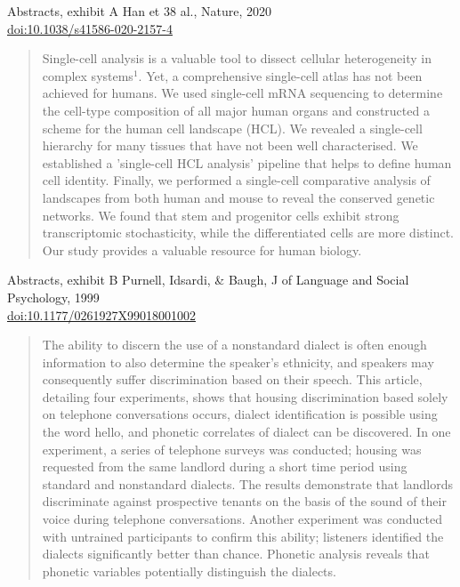 \documentclass[
	onepage, 
	12pt,
	hyperref={
		colorlinks = true,
		linkcolor = blue,
		urlcolor  = blue,
		citecolor = blue,
		anchorcolor = blue
	},
]{beamer}
\begin{document}
\begin{frame}[t]{Abstracts, exhibit A}{}
	\footnotesize
	Han et 38 al., Nature, 2020
	\\
	\href{https://doi.org/10.1038/s41586-020-2157-4}{doi:10.1038/s41586-020-2157-4}
	\begin{quote}
		Single-cell analysis is a valuable tool to dissect cellular heterogeneity in complex systems${}^{\text{1}}$. Yet, a comprehensive single-cell atlas has not been achieved for humans. We used single-cell mRNA sequencing to determine the cell-type composition of all major human organs and constructed a scheme for the human cell landscape (HCL). We revealed a single-cell hierarchy for many tissues that have not been well characterised. We established a 'single-cell HCL analysis' pipeline that helps to define human cell identity. Finally, we performed a single-cell comparative analysis of landscapes from both human and mouse to reveal the conserved genetic networks. We found that stem and progenitor cells exhibit strong transcriptomic stochasticity, while the differentiated cells are more distinct. Our study provides a valuable resource for human biology.
	\end{quote}
\end{frame}


\begin{frame}[t]{Abstracts, exhibit B}{}
	\footnotesize
	Purnell, Idsardi, \& Baugh, 
	J of Language and Social Psychology, 1999
	\\
	\href{https://journals.sagepub.com/doi/10.1177/0261927X99018001002}{doi:10.1177/0261927X99018001002}
	\begin{quote}
		The ability to discern the use of a nonstandard dialect is often enough information to also determine the speaker's ethnicity, and speakers may consequently suffer discrimination based on their speech. This article, detailing four experiments, shows that housing discrimination based solely on telephone conversations occurs, dialect identification is possible using the word hello, and phonetic correlates of dialect can be discovered. In one experiment, a series of telephone surveys was conducted; housing was requested from the same landlord during a short time period using standard and nonstandard dialects. The results demonstrate that landlords discriminate against prospective tenants on the basis of the sound of their voice during telephone conversations. Another experiment was conducted with untrained participants to confirm this ability; listeners identified the dialects significantly better than chance. Phonetic analysis reveals that phonetic variables potentially distinguish the dialects.
	\end{quote}
\end{frame}
\end{document}
